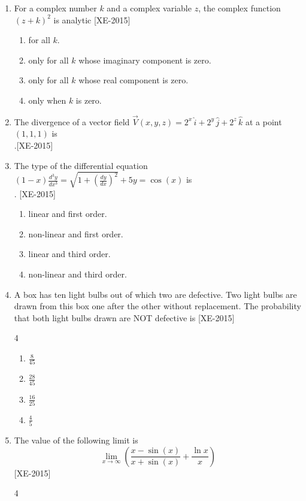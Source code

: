 \documentclass[journal]{IEEEtran}
\begin{document}
\begin{enumerate}
    \item For a complex number $k$ and a complex variable $z$, the complex function $(z + k)^2$ is analytic \hfill{[XE-2015]}
    \begin{enumerate}
        \item for all $k$.
        \item only for all $k$ whose imaginary component is zero.
        \item only for all $k$ whose real component is zero.
        \item only when $k$ is zero.
    \end{enumerate}
\item The divergence of a vector field $\vec{V}(x, y, z) = 2^x \, \hat{i} + 2^y \, \hat{j} + 2^z \, \hat{k}$ at a point $(1,1,1)$ is \\.\hfill{[XE-2015]} \\
    \item The type of the differential equation $(1 - x) \frac{d^3 y}{dx^3} = \sqrt{1 + \left( \frac{dy}{dx} \right)^2} + 5y = \cos(x)$ is \\. \hfill{[XE-2015]}
    \begin{enumerate}
        \item linear and first order.
        \item non-linear and first order.
        \item linear and third order.
        \item non-linear and third order.
    \end{enumerate}

    \item A box has ten light bulbs out of which two are defective. Two light bulbs are drawn from this box one after the other without replacement. The probability that both light bulbs drawn are NOT defective is \hfill{[XE-2015]}
    \begin{multicols}{4}
    \begin{enumerate}
        \item $\frac{8}{45}$
        \item $\frac{28}{45}$
        \item $\frac{16}{25}$
        \item $\frac{4}{5}$
    \end{enumerate}
    \end{multicols}

   \item The value of the following limit is 
\[
\lim_{x \to \infty} \left( \frac{x - \sin(x)}{x + \sin(x)} + \frac{\ln x}{x} \right)
\] \hfill{[XE-2015]}
\begin{multicols}{4}
    


\end{multicols}
\end{enumerate}
\end{document}
